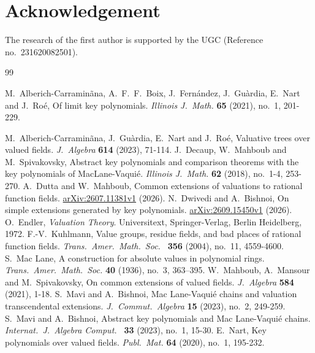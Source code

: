 \documentclass[11pt]{amsart}
\theoremstyle{definition}
\theoremstyle{remark}
\numberwithin{equation}{section}
\begin{document}
	\section*{Acknowledgement}
	The research of the first author is supported by the UGC
	(Reference no.\ 231620082501).
	\begin{thebibliography}{99}
			 
		
			  M.\ Alberich-Carramin\~ ana, A.\ F.\ F.\  Boix, J.\ Fern\'andez, J.\ Gu\`ardia, E.\ Nart and J.\  Ro\'e,  Of limit key polynomials.  {\it Illinois J.\  Math.} {\bf 65} (2021), no.\ 1, 201-229.
		 
			 M.\ Alberich-Carramin\~ ana,  J.\ Gu\`ardia, E.\ Nart and J.\  Ro\'e, Valuative trees over valued fields. {\it J.\ Algebra} {\bf 614} (2023), 71-114.
			 J.\  Decaup, W.\  Mahboub and M.\  Spivakovsky,  Abstract key polynomials and comparison theorems with the key polynomials of MacLane-Vaqui\'e. {\it Illinois J.\ Math.} {\bf 62} (2018), no.\ 1-4, 253-270.
			 A.\ Dutta and W.\ Mahboub, Common extensions of valuations to rational function fields. \hyperlink{https://arxiv.org/abs/2607.11381}{arXiv:2607.11381v1} (2026).
			 N.\ Dwivedi and A.\ Bishnoi, On simple extensions generated by key polynomials. \hyperlink{https://arxiv.org/abs/2609.15450}{arXiv:2609.15450v1} (2026).
			 O.\ Endler, {\it Valuation Theory}. Universitext, Springer-Verlag, Berlin Heidelberg, 1972. 
			 F.-V.\ Kuhlmann, Value groups, residue fields, and bad places of rational function fields. {\it Trans.\ Amer.\ Math.\ Soc.\ } {\bf 356} (2004), no.\ 11, 4559-4600.
		 S.\  Mac Lane,  A construction for absolute values in polynomial rings. {\it Trans.\  Amer.\  Math.\  Soc.} {\bf 40} (1936), no.\  3, 363--395.
	 W.\ Mahboub, A.\ Mansour and M.\ Spivakovsky, On common extensions of valued fields. {\it J.\ Algebra} {\bf 584} (2021), 1-18.
	 S.\ Mavi and A.\ Bishnoi, Mac Lane-Vaqui\'e chains and valuation transcendental extensions. {\it J.\ Commut.\ Algebra} {\bf 15} (2023), no.\ 2, 249-259.
	 S.\ Mavi and A.\ Bishnoi, Abstract key polynomials and Mac Lane-Vaqui\'e chains. {\it Internat.\ J.\ Algebra Comput.\ } {\bf 33} (2023), no.\ 1, 15-30.
	 E.\ Nart, Key polynomials over valued fields. {\it Publ.\ Mat.} {\bf 64} (2020), no.\ 1, 195-232.
	

\end{thebibliography}
\end{document}
